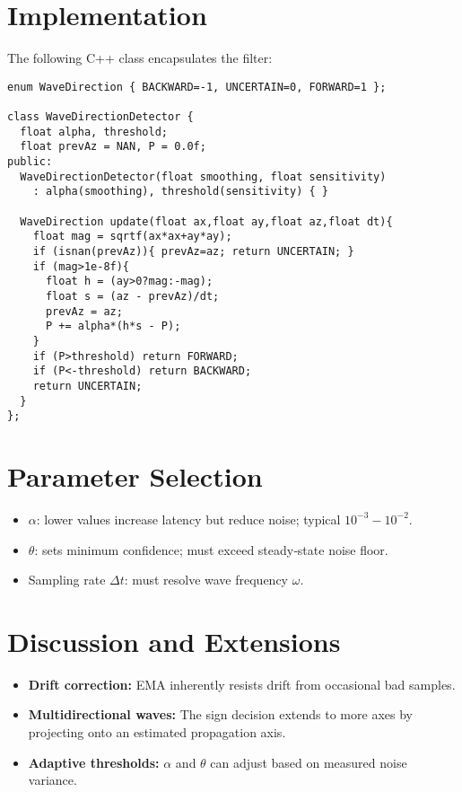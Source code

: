 \documentclass[11pt,letterpaper]{article}
\begin{document}
\section{Implementation}
The following C++ class encapsulates the filter:

\begin{verbatim}
enum WaveDirection { BACKWARD=-1, UNCERTAIN=0, FORWARD=1 };

class WaveDirectionDetector {
  float alpha, threshold;
  float prevAz = NAN, P = 0.0f;
public:
  WaveDirectionDetector(float smoothing, float sensitivity)
    : alpha(smoothing), threshold(sensitivity) { }

  WaveDirection update(float ax,float ay,float az,float dt){
    float mag = sqrtf(ax*ax+ay*ay);
    if (isnan(prevAz)){ prevAz=az; return UNCERTAIN; }
    if (mag>1e-8f){
      float h = (ay>0?mag:-mag);
      float s = (az - prevAz)/dt;
      prevAz = az;
      P += alpha*(h*s - P);
    }
    if (P>threshold) return FORWARD;
    if (P<-threshold) return BACKWARD;
    return UNCERTAIN;
  }
};
\end{verbatim}

\section{Parameter Selection}
\begin{itemize}
  \item \(\alpha\): lower values increase latency but reduce noise; typical \(10^{-3}\!-\!10^{-2}\).
  \item \(\theta\): sets minimum confidence; must exceed steady‐state noise floor.
  \item Sampling rate \(\Delta t\): must resolve wave frequency \(\omega\).
\end{itemize}

\section{Discussion and Extensions}
\begin{itemize}
  \item \textbf{Drift correction:} EMA inherently resists drift from occasional bad samples.
  \item \textbf{Multidirectional waves:} The sign decision extends to more axes by projecting onto an estimated propagation axis.
  \item \textbf{Adaptive thresholds:} \(\alpha\) and \(\theta\) can adjust based on measured noise variance.
\end{itemize}
\end{document}
